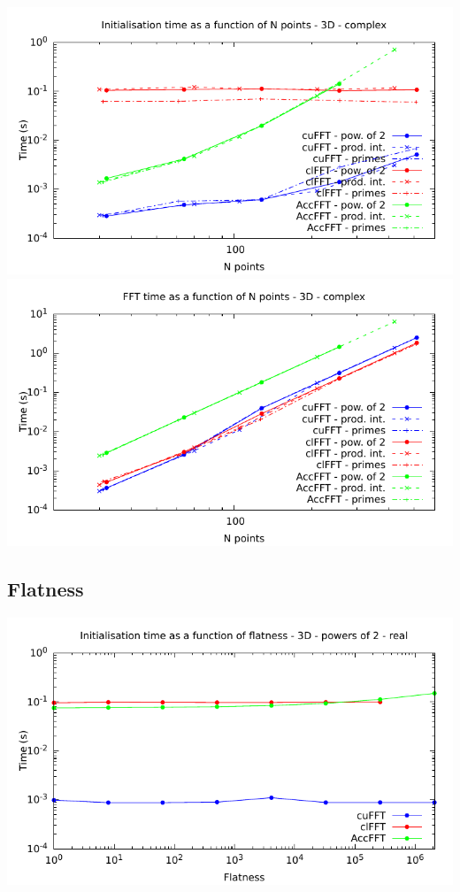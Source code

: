 \documentclass[12pt, a4paper]{article}
\begin{document}
\includegraphics[height=8cm]{graphs/fft-3d-c-init.pdf}\\
\includegraphics[height=8cm]{graphs/fft-3d-c-exec.pdf}\\
\subsection{Flatness}
\includegraphics[height=8cm]{graphs/flatness-r-init.pdf}\\
\end{document}
